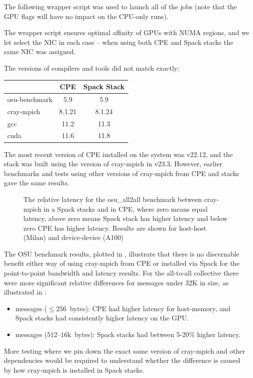 The following wrapper script was used to launch all of the jobs (note that the GPU flags will have no impact on the CPU-only runs).

The wrapper script ensures optimal affinity of GPUs with NUMA regions, and we let \craympich select the NIC in each case -- when using both CPE and Spack stacks the same NIC was assigned.

The versions of compilers and tools did not match exactly:
\begin{center}
    \begin{tabular}{l |c  c }
                      & CPE   & Spack Stack \\
          \hline
        osu-benchmark & 5.9   & 5.9       \\
        cray-mpich    & 8.1.21& 8.1.24    \\
        gcc           & 11.2  & 11.3      \\
        cuda          & 11.6  & 11.8      \\
    \end{tabular}
\end{center}

The most recent version of CPE installed on the system was v22.12, and the stack was built using the version of cray-mpich in v23.3. However, earlier benchmarks and tests using other versions of cray-mpich from CPE and \spack stacks gave the same results.

\begin{figure}[htp!]
    \begin{center}
        
    \end{center}
    \caption{The relative latency for the osu\_all2all benchmark between cray-mpich in a Spack stacks and in CPE, where zero means equal latency, above zero means Spack stack has higher latency and below zero CPE has higher latency. Results are shown for host-host (Milan) and device-device (A100)}
    \label{fig:osu-a2a-relative}
\end{figure}

The OSU benchmark results, plotted in , illustrate that there is no discernable benefit either way of using cray-mpich from CPE or installed via Spack for the point-to-point bandwidth and latency results.
For the all-to-all collective there were more significant relative differences for messages under 32K in size, as illustrated in :
\begin{itemize}
    \item messages ($\leq 256$~bytes): CPE had higher latency for host-memory, and Spack stacks had consistently higher latency on the GPU.
    \item messages ($512$--$16$k~bytes): Spack stacks had between 5-20\% higher latency.
\end{itemize}
More testing where we pin down the exact same version of cray-mpich and other dependencies would be required to understand whether the difference is caused by how cray-mpich is installed in Spack stacks.

